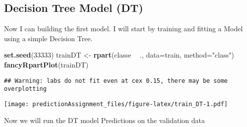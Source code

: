 \documentclass[]{article}
\newenvironment{Shaded}{\begin{snugshade}}{\end{snugshade}}
\newcommand{\DataTypeTok}[1]{\textcolor[rgb]{0.13,0.29,0.53}{#1}}
\newcommand{\DecValTok}[1]{\textcolor[rgb]{0.00,0.00,0.81}{#1}}
\newcommand{\KeywordTok}[1]{\textcolor[rgb]{0.13,0.29,0.53}{\textbf{#1}}}
\newcommand{\NormalTok}[1]{#1}
\newcommand{\OperatorTok}[1]{\textcolor[rgb]{0.81,0.36,0.00}{\textbf{#1}}}
\newcommand{\StringTok}[1]{\textcolor[rgb]{0.31,0.60,0.02}{#1}}
\begin{document}
\hypertarget{decision-tree-model-dt}{%
\subsection{Decision Tree Model (DT)}\label{decision-tree-model-dt}}

Now I can building the first model. I will start by training and fitting
a Model using a simple Decision Tree.

\begin{Shaded}
\begin{Highlighting}[]
\KeywordTok{set.seed}\NormalTok{(}\DecValTok{33333}\NormalTok{)}
\NormalTok{trainDT <-}\StringTok{ }\KeywordTok{rpart}\NormalTok{(classe }\OperatorTok{~}\StringTok{ }\NormalTok{., }\DataTypeTok{data=}\NormalTok{train, }\DataTypeTok{method=}\StringTok{"class"}\NormalTok{)}
\KeywordTok{fancyRpartPlot}\NormalTok{(trainDT)}
\end{Highlighting}
\end{Shaded}

\begin{verbatim}
## Warning: labs do not fit even at cex 0.15, there may be some overplotting
\end{verbatim}

\texttt{[image: predictionAssignment\_files/figure-latex/train\_DT-1.pdf]}

Now we will run the DT model Predictions on the validation data

\begin{Shaded}
\end{Shaded}
\end{document}
